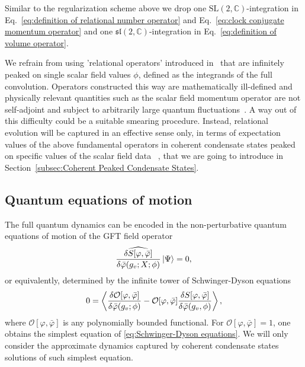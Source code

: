 \documentclass[11pt,a4paper]{article}
\newcommand{\C}{\mathbb C}
\newcommand{\SL}{\text{SL$(2,\C)$}}
\newcommand{\spl}{\mathfrak{sl}\left(2,\C\right)}
\begin{document}
Similar to the regularization scheme above we drop one $\SL$-integration in Eq.~\eqref{eq:definition of relational number operator} and Eq.~\eqref{eq:clock conjugate momentum operator} and one $\spl$-integration in  Eq.~\eqref{eq:definition of volume operator}.

We refrain from using 'relational operators' introduced in~\cite{Oriti:2016qtz} that are infinitely peaked on single scalar field values $\phi$, defined as the integrands of the full convolution. Operators constructed this way are mathematically ill-defined and physically relevant quantities such as the scalar field momentum operator are not self-adjoint and subject to arbitrarily large quantum fluctuations~\cite{Marchetti:2020umh,Marchetti:2020qsq}. A way out of this difficulty could be a suitable smearing procedure. Instead, relational evolution will be captured in an effective sense only, in terms of expectation values of the above fundamental operators in coherent condensate states peaked on specific values of the scalar field data ~\cite{Marchetti:2020umh}, that we are going to introduce in Section~\ref{subsec:Coherent Peaked Condensate States}.

\subsection{Quantum equations of motion}\label{subsec:Quantum Equations of Motion}

The full quantum dynamics can be encoded in the non-perturbative quantum equations of motion of the GFT field operator
%
\begin{equation}\label{eq:operator quantum equations of motion}
\widehat{\frac{\delta S[\varphi,\bar{\varphi}]}{\delta\bar{\varphi}(g_v;X;\phi)}}\ket{\Psi} = 0 , 
\end{equation} 
%
or equivalently, determined by the infinite tower of Schwinger-Dyson equations~\cite{Gielen:2013naa}
%
\begin{equation}\label{eq:Schwinger-Dyson equations}
0
=
\expval{\fdv{\mathcal{O}[\varphi,\bar{\varphi}]}{\bar{\varphi}(g_v;\phi)}-\mathcal{O}[\varphi,\bar{\varphi}]\fdv{S[\varphi,\bar{\varphi}]}{\bar{\varphi}(g_v,\phi)}},
\end{equation}
%
where $\mathcal{O}[\varphi,\bar{\varphi}]$ is any polynomially bounded functional. For $\mathcal{O}[\varphi,\bar{\varphi}] = 1$, one obtains the simplest equation of \eqref{eq:Schwinger-Dyson equations}. We will only consider the approximate dynamics captured by coherent condensate states solutions of such simplest equation.
\end{document}
